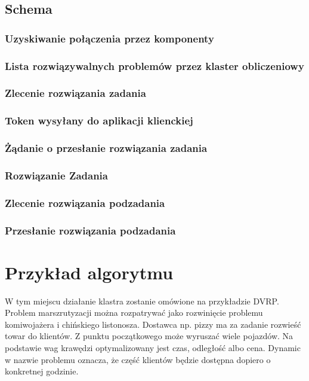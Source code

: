 \documentclass[12pt,a4paper,titlepage]{report}
\begin{document}
	\section{Schema}
		\subsection{Uzyskiwanie połączenia przez komponenty}	
			
		\subsection{Lista rozwiązywalnych problemów przez klaster obliczeniowy}
			
		\subsection{Zlecenie rozwiązania zadania}
			
		\subsection{Token wysyłany do aplikacji klienckiej}
			
		\subsection{Żądanie o przesłanie rozwiązania zadania}
			
		\subsection{Rozwiązanie Zadania}
			
		\subsection{Zlecenie rozwiązania podzadania}
			
		\subsection{Przesłanie rozwiązania podzadania}
			
			
\chapter{Przykład algorytmu}
		W tym miejscu działanie klastra zostanie omówione na przykładzie DVRP. Problem marszrutyzacji można rozpatrywać jako rozwinięcie problemu komiwojażera i chińskiego listonosza. Dostawca np. pizzy ma za zadanie rozwieść towar do klientów. Z punktu początkowego może wyruszać wiele pojazdów. Na podstawie wag krawędzi optymalizowany jest czas, odległość albo cena. Dynamic w nazwie problemu oznacza, że część klientów będzie dostępna dopiero o konkretnej godzinie.
		
\end{document}
